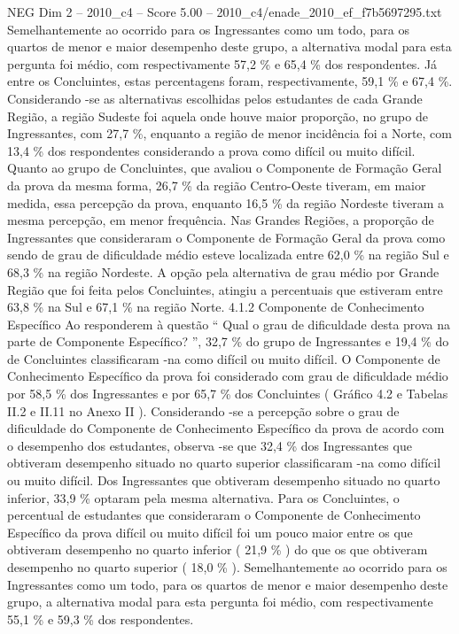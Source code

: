 \begin{textsample}{NEG Dim 2 – 2010\_c4 – Score 5.00 – 2010\_c4/enade\_2010\_ef\_f7b5697295.txt}
Semelhantemente ao ocorrido para os Ingressantes como um todo, para os quartos de menor e maior desempenho deste grupo, a alternativa modal para esta pergunta foi médio, com respectivamente 57,2 \% e 65,4 \% dos respondentes.
Já entre os Concluintes, estas percentagens foram, respectivamente, 59,1 \% e 67,4 \%.
Considerando -se as alternativas escolhidas pelos estudantes de cada Grande Região, a região Sudeste foi aquela onde houve maior proporção, no grupo de Ingressantes, com 27,7 \%, enquanto a região de menor incidência foi a Norte, com 13,4 \% dos respondentes considerando a prova como difícil ou muito difícil.
Quanto ao grupo de Concluintes, que avaliou o Componente de Formação Geral da prova da mesma forma, 26,7 \% da região Centro-Oeste tiveram, em maior medida, essa percepção da prova, enquanto 16,5 \% da região Nordeste tiveram a mesma percepção, em menor frequência.
Nas Grandes Regiões, a proporção de Ingressantes que consideraram o Componente de Formação Geral da prova como sendo de grau de dificuldade médio esteve localizada entre 62,0 \% na região Sul e 68,3 \% na região Nordeste.
A opção pela alternativa de grau médio por Grande Região que foi feita pelos Concluintes, atingiu a percentuais que estiveram entre 63,8 \% na Sul e 67,1 \% na região Norte. 4.1.2 Componente de Conhecimento Específico Ao responderem à questão “ Qual o grau de dificuldade desta prova na parte de Componente Específico? ”, 32,7 \% do grupo de Ingressantes e 19,4 \% do de Concluintes classificaram -na como difícil ou muito difícil.
O Componente de Conhecimento Específico da prova foi considerado com grau de dificuldade médio por 58,5 \% dos Ingressantes e por 65,7 \% dos Concluintes ( Gráfico 4.2 e Tabelas II.2 e II.11 no Anexo II ).
Considerando -se a percepção sobre o grau de dificuldade do Componente de Conhecimento Específico da prova de acordo com o desempenho dos estudantes, observa -se que 32,4 \% dos Ingressantes que obtiveram desempenho situado no quarto superior classificaram -na como difícil ou muito difícil.
Dos Ingressantes que obtiveram desempenho situado no quarto inferior, 33,9 \% optaram pela mesma alternativa.
Para os Concluintes, o percentual de estudantes que consideraram o Componente de Conhecimento Específico da prova difícil ou muito difícil foi um pouco maior entre os que obtiveram desempenho no quarto inferior ( 21,9 \% ) do que os que obtiveram desempenho no quarto superior ( 18,0 \% ).
Semelhantemente ao ocorrido para os Ingressantes como um todo, para os quartos de menor e maior desempenho deste grupo, a alternativa modal para esta pergunta foi médio, com respectivamente 55,1 \% e 59,3 \% dos respondentes.

\end{textsample}
